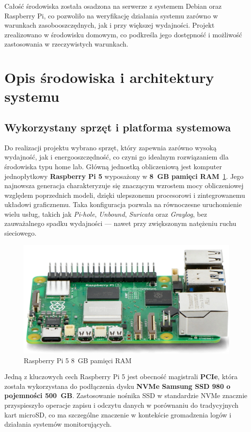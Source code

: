 \documentclass[
    left=2.5cm,         %
    right=2.5cm,        %
    top=2.5cm,          %
    bottom=3cm,         %
    bindingoffset=6mm,  %
    nohyphenation=true %
]{eiti/eiti-thesis} %
\begin{document}
Całość środowiska została osadzona na serwerze z systemem Debian oraz Raspberry Pi, co pozwoliło na weryfikację działania systemu zarówno w warunkach zasobooszczędnych, jak i przy większej wydajności. Projekt zrealizowano w środowisku domowym, co podkreśla jego dostępność i możliwość zastosowania w rzeczywistych warunkach.

\newpage 
\section{Opis środowiska i architektury systemu}
\subsection{Wykorzystany sprzęt i platforma systemowa}

Do realizacji projektu wybrano sprzęt, który zapewnia zarówno wysoką wydajność, jak i energooszczędność, co czyni go idealnym rozwiązaniem dla środowiska typu home lab. Główną jednostką obliczeniową jest komputer jednopłytkowy \textbf{Raspberry Pi 5}\cite{raspberry-start} wyposażony w \textbf{8~GB pamięci RAM}~\ref{fig:raspberry}. Jego najnowsza generacja charakteryzuje się znaczącym wzrostem mocy obliczeniowej względem poprzednich modeli, dzięki ulepszonemu procesorowi i zintegrowanemu układowi graficznemu. Taka konfiguracja pozwala na równoczesne uruchomienie wielu usług, takich jak \textit{Pi-hole}, \textit{Unbound}, \textit{Suricata} oraz \textit{Graylog}, bez zauważalnego spadku wydajności — nawet przy zwiększonym natężeniu ruchu sieciowego.
\begin{figure}[H]
    \centering
    \includegraphics[width=\textwidth]{img/raspberry_pi_5.png}
    \caption{Raspberry Pi 5 8~GB pamięci RAM}
    \label{fig:raspberry}
\end{figure}

Jedną z kluczowych cech Raspberry Pi 5 jest obecność magistrali \textbf{PCIe}, która została wykorzystana do podłączenia dysku \textbf{NVMe Samsung SSD 980 o pojemności 500~GB}. Zastosowanie nośnika SSD w standardzie NVMe znacznie przyspieszyło operacje zapisu i odczytu danych w porównaniu do tradycyjnych kart microSD, co ma szczególne znaczenie w kontekście gromadzenia logów i działania systemów monitorujących.
\end{document}
